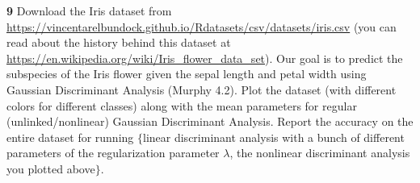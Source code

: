 \documentclass[12pt,letterpaper,fleqn]{hmcpset}
\begin{document}
\newpage


\textbf{9} Download the Iris dataset from \url{https://vincentarelbundock.github.io/Rdatasets/csv/datasets/iris.csv}
(you can read about the history behind this dataset at \url{https://en.wikipedia.org/wiki/Iris_flower_data_set}).
Our goal is to predict the subspecies of the Iris flower given the sepal length and petal
width using Gaussian Discriminant Analysis (Murphy 4.2). Plot the dataset (with different
colors for different classes) along with the mean parameters for regular (unlinked/nonlinear)
Gaussian Discriminant Analysis. Report the accuracy on the entire dataset for running
$\{$linear discriminant analysis with a bunch of different parameters of the regularization
parameter $\lambda$, the nonlinear discriminant analysis you plotted above$\}$.
\end{document}

